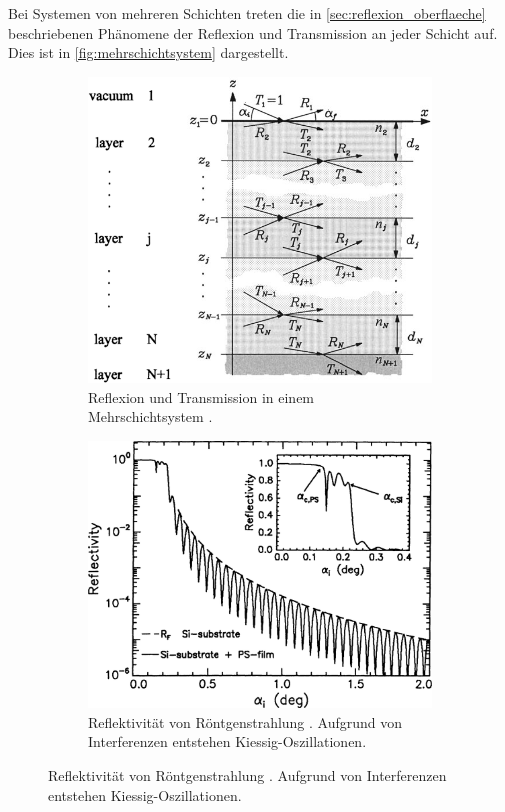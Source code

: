 Bei Systemen von mehreren Schichten treten die in \autoref{sec:reflexion_oberflaeche} beschriebenen Phänomene der Reflexion und Transmission an jeder Schicht auf.
Dies ist in \autoref{fig:mehrschichtsystem} dargestellt.
\begin{figure}
    \centering
    \begin{subfigure}{0.48\textwidth}
        \centering
        \includegraphics[width=\textwidth]{content/img/Tolan_2.6.png}
        \caption{Reflexion und Transmission in einem Mehrschichtsystem \cite{tolan}.}
        \label{fig:mehrschichtsystem}
    \end{subfigure}
    \hfill
    \begin{subfigure}{0.48\textwidth}
        \centering
        \includegraphics[width=\textwidth]{content/img/Tolan_2.7.png}
        \caption{Reflektivität von Röntgenstrahlung \cite{tolan}.
        Aufgrund von Interferenzen entstehen Kiessig-Oszillationen.}
        \label{fig:kiessig_oszillationen}
    \end{subfigure}
\end{figure}
